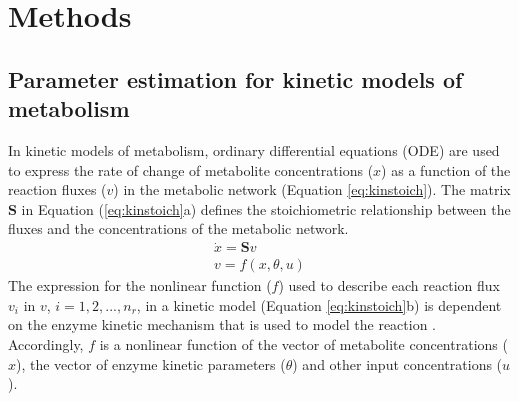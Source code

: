 \documentclass[10pt]{article}
\begin{document}
 
	
	\section{Methods}\label{sec:methods}
	\subsection{Parameter estimation for kinetic models of metabolism}\label{sec:kinetic_model}
	In kinetic models of metabolism, ordinary differential equations (ODE) are used to express the rate of change of metabolite concentrations ($x$) as a function of the reaction fluxes ($v$) in the metabolic network (Equation \ref{eq:kinstoich}). The matrix $\mathbf{S}$ in Equation (\ref{eq:kinstoich}a) defines the stoichiometric relationship between the fluxes and the concentrations of the metabolic network.
	\begin{subequations}\label{eq:kinstoich}
		\begin{align}
		\dot{x} = \mathbf{S}v\\
		v = f(x, \theta, u)
		\end{align}
	\end{subequations}
	The expression for the nonlinear function ($f$) used to describe each reaction flux $v_i$ in $v$, $i={1, 2, ..., n_r}$, in a kinetic model (Equation \ref{eq:kinstoich}b) is dependent on the enzyme kinetic mechanism that is used to model the reaction \parencite{Srinivasan2015}. Accordingly, $f$ is a nonlinear function of the vector of metabolite concentrations ($x$), the vector of enzyme kinetic parameters ($\theta$) and other input concentrations ($u$). 
	
\end{document}
